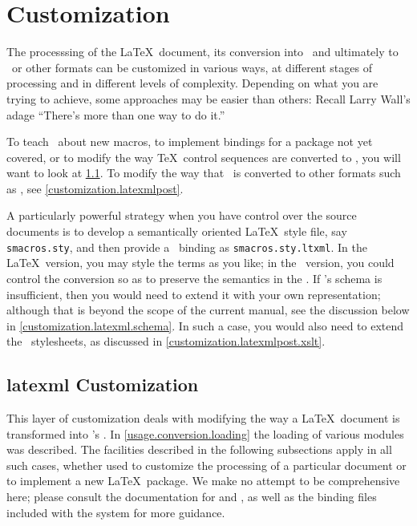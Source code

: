 \documentclass{book}
\begin{document}
\chapter{Customization}\label{customization}
The processsing of the \LaTeX\ document, its  conversion into \XML\ and ultimately
to \XHTML\ or other formats can be customized in various ways, at
different stages of processing and in different levels of complexity.
Depending on what you are trying to achieve, some approaches may be easier
than others: Recall Larry Wall's adage ``There's more than one way to do it.''

To teach \LaTeXML\ about new macros, to implement bindings for a
package not yet covered, or to modify the way \TeX\ control sequences
are converted to \XML, you will want to look at \ref{customization.latexml}.
To modify the way that \XML\ is converted to other formats such as \HTML,
see \ref{customization.latexmlpost}.

A particularly powerful strategy when you have control over the
source documents is to develop a semantically oriented \LaTeX\ style file,
say \texttt{smacros.sty}, and then provide a \LaTeXML\ binding
as \texttt{smacros.sty.ltxml}. In the \LaTeX\ version, you may style
the terms as you like; in the \LaTeXML\ version, you could control
the conversion so as to preserve the semantics in the \XML.
If \LaTeXML's schema is insufficient, then you would need to extend it
with your own representation; although that is beyond the scope of
the current manual, see the discussion below in \ref{customization.latexml.schema}.
In such a case, you would also need to extend the \XSLT\ stylesheets,
as discussed in \ref{customization.latexmlpost.xslt}.

\section{latexml Customization}\label{customization.latexml}
This layer of customization deals with modifying the way a \LaTeX\ document
is transformed into \LaTeXML's \XML.
In \ref{usage.conversion.loading} the loading of various modules was
described.  The facilities described in the following subsections
apply in all such cases, whether used to customize the processing
of a particular document or to implement a new \LaTeX\ package.
We make no attempt to be comprehensive here; please consult
the documentation for  and ,
as well as the binding files included with the system
for more guidance.
\end{document}
